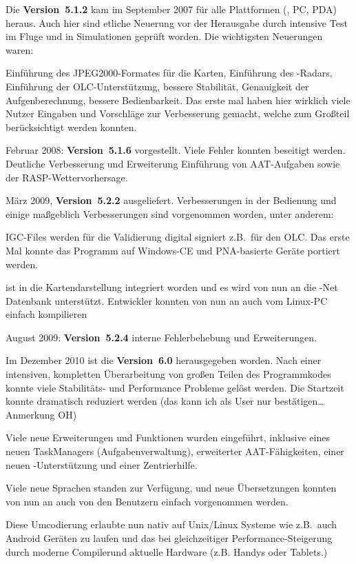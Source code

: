 Die {\bf Version~5.1.2} kam im September 2007 für alle Plattformen (\xc, PC, PDA) heraus.
Auch hier sind etliche Neuerung vor der Herausgabe  durch intensive Test im Fluge und in Simulationen geprüft worden.
Die wichtigsten Neuerungen waren: 

Einführung des JPEG2000-Formates für die Karten, Einführung des \fl-Radars, Einführung der
OLC-Unterstützung, bessere Stabilität, Genauigkeit der Aufgenberechnung, bessere Bedienbarkeit.
Das erste mal haben hier wirklich viele Nutzer Eingaben und Vorschläge zur Verbesserung gemacht,
welche  zum Großteil berücksichtigt werden konnten.

Februar 2008:  {\bf Version~5.1.6} vorgestellt. Viele Fehler konnten beseitigt werden. Deutliche Verbesserung und
Erweiterung Einführung von AAT-Aufgaben sowie der RASP-Wettervorhersage.

März 2009, {\bf Version~5.2.2} ausgeliefert. Verbesserungen in der Bedienung und einige maßgeblich Verbesserungen sind
vorgenommen worden, unter anderem:

IGC-Files werden für die Validierung digital signiert z.B.\ für den OLC. Das erste Mal konnte das Programm auf Windows-CE 
und PNA-basierte Geräte portiert werden.

\fl ist in die Kartendarstellung integriert worden und es wird von nun an die \fl-Net Datenbank unterstützt.
Entwickler konnten von nun an \xc auch vom Linux-PC einfach kompilieren

August  2009: {\bf Version~5.2.4} interne Fehlerbehebung und Erweiterungen.

Im Dezember 2010 ist die {\bf Version~6.0} herausgegeben worden.
Nach einer intensiven, kompletten  Überarbeitung von großen Teilen des Programmkodes konnte viele Stabilitäts- und Performance
Probleme gelöst werden. Die Startzeit konnte dramatisch reduziert werden {(\small das kann ich als User nur bestätigen\dots Anmerkung OH)}

Viele neue Erweiterungen und Funktionen wurden eingeführt, inklusive eines neuen TaskManagers (Aufgabenverwaltung), 
erweiterter AAT-Fähigkeiten, einer neuen \fl-Unterstützung und einer Zentrierhilfe. 

Viele neue Sprachen standen zur Verfügung, und neue Übersetzungen konnten von nun an auch von
den Benutzern einfach vorgenommen werden.

Diese Umcodierung erlaubte \xc nun nativ auf Unix/Linux Systeme wie z.B.\ auch Android Geräten zu laufen
und das bei gleichzeitiger Performance-Steigerung durch moderne Compilerund aktuelle Hardware (z.B. Handys oder Tablets.)

